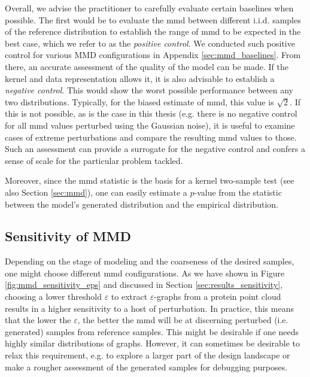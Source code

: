 Overall, we advise the practitioner to carefully evaluate certain baselines when
possible. The first would be to evaluate the \acrshort{mmd} between different
i.i.d. samples of the reference distribution to establish the range of
\acrshort{mmd} to be expected in the best case, which we refer to as the
\emph{positive control}. We conducted such positive control for various MMD
configurations in Appendix \ref{sec:mmd_baselines}. From there, an accurate
assessment of the quality of the model can be made. If the kernel and data
representation allows it, it is also advisable to establish a \emph{negative
control}. This would show the worst possible performance between any two
distributions. Typically, for the biased estimate of \acrshort{mmd}, this value
is $\sqrt{2}$. If this is not possible, as is the case in this thesis (e.g.
there is no negative control for all \acrshort{mmd} values perturbed using the
Gaussian noise), it is useful to examine cases of extreme perturbations and
compare the resulting \acrshort{mmd} values to those. Such an assessment can
provide a surrogate for the negative control and confers a sense of scale for
the particular problem tackled.

Moreover, since the \acrshort{mmd} statistic is the basis for a kernel two-sample test
\citep{gretton2012kernel} (see also Section \ref{sec:mmd}), one can easily
estimate a $p$-value from the statistic between the model's generated
distribution and the empirical distribution.

\subsection{Sensitivity of MMD}\label{sec:discussion_right_mmd}
Depending on the stage of modeling and the coarseness of the desired samples,
one might choose different \acrshort{mmd} configurations. As we have shown in Figure
\ref{fig:mmd_sensitivity_eps} and discussed in Section
\ref{sec:results_sensitivity}, choosing a lower threshold $\varepsilon$ to
extract $\varepsilon$-graphs from a protein point cloud results in a higher
sensitivity to a host of perturbation. In practice, this means that the lower the
$\varepsilon$, the better the \acrshort{mmd} will be at discerning perturbed (i.e.
generated) samples from reference samples. This might be desirable if one needs
highly similar distributions of graphs. However, it can sometimes be desirable
to relax this requirement, e.g. to explore a larger part of the design landscape
or make a rougher assessment of the generated samples for debugging purposes.

